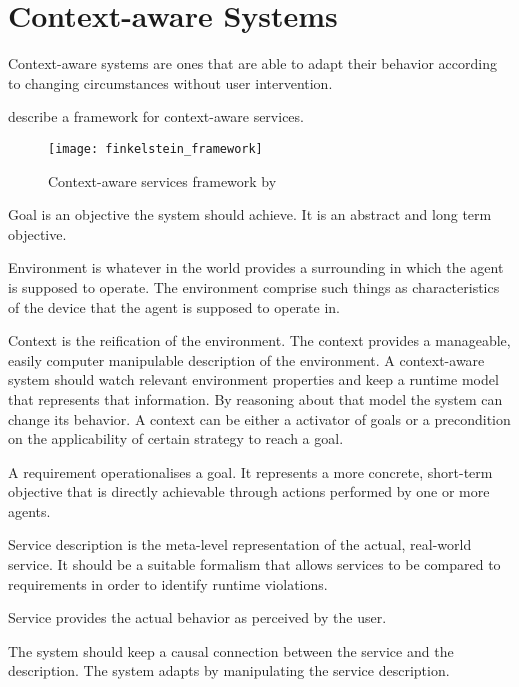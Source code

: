 \section{Context-aware Systems}
Context-aware systems are ones that are able to adapt their behavior according to changing circumstances without user intervention.

\cite{finkelstein_framework_2001} describe a framework for context-aware services.

\begin{figure}[!htb]
  \centering
  \texttt{[image: finkelstein\_framework]}
  \caption{Context-aware services framework by~\cite{finkelstein_framework_2001}}
\label{fig:finkelstein_framework}
\end{figure}

Goal is an objective the system should achieve. It is an abstract and long term objective.

Environment is whatever in the world provides a surrounding in which the agent is supposed to operate. The environment comprise such things as characteristics of the device that the agent is supposed to operate in.

Context is the reification of the environment. The context provides a manageable, easily computer manipulable description of the environment. A context-aware system should watch relevant environment properties and keep a runtime model that represents that information. By reasoning about that model the system can change its behavior. A context can be either a activator of goals or a precondition on the applicability of certain strategy to reach a goal.

A requirement operationalises a goal. It represents a more concrete, short-term objective that is directly achievable through actions performed by one or more agents.

Service description is the meta-level representation of the actual, real-world service. It should be a suitable formalism that allows services to be compared to requirements in order to identify runtime violations.

Service provides the actual behavior as perceived by the user.

The system should keep a causal connection between the service and the description. The system adapts by manipulating the service description.

